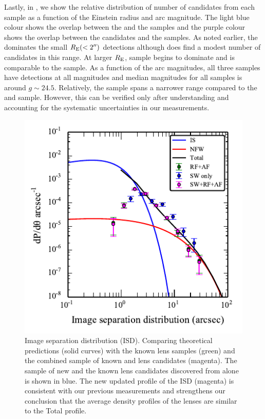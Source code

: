 \documentclass[useAMS,usenatbib,a4paper]{mn2e}
\begin{document}
Lastly, in , we show the relative distribution of
number of candidates from each sample as a function of the Einstein
radius and arc magnitude. The light blue colour shows the overlap between
the \sw and the \rf samples and the purple colour shows the overlap
between the \sw candidates and the \af samples. As noted earlier, the
\rf dominates the small $R_{\rm E} (<2\hbox{$^{\prime\prime}$})$ detections although \sw does
find a modest number of candidates in this range. At larger $R_{\rm E}$,
\sw sample begins to dominate and is comparable to the \af sample.  As a
function of the arc magnitudes, all three samples have detections at all
magnitudes and median magnitudes for all samples is around $g\sim24.5$.
Relatively, the \rf sample spans a narrower range compared to the \sw
and \af sample. However, this can be verified only after understanding
and accounting for the systematic uncertainties in our measurements.

\begin{figure}
\begin{center}
\includegraphics[scale=1.2]{isd_cfhtls_sw.pdf}
\caption{ \label{fig:isd} Image separation distribution (ISD). Comparing theoretical
predictions (solid curves) with the \cfhtls known lens samples (green)
and the combined sample of known and \sw lens candidates (magenta). The
sample of new and the known lens candidates discovered from \sw alone is
shown in blue. The new updated profile of the ISD (magenta) is
consistent with our previous measurements and strengthens our conclusion
that the average density profiles of the lenses are similar to the Total
profile.}
\end{center}
\end{figure}
\end{document}
